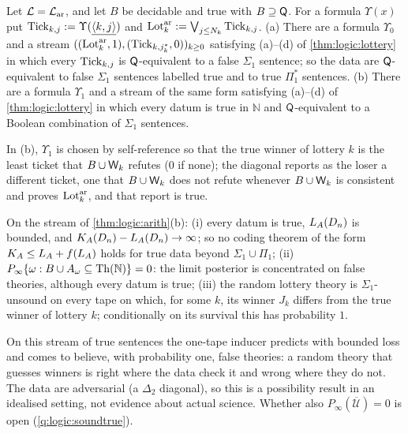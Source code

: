 \begin{theorem}\label{thm:logic:arith}
Let $\mathcal L=\mathcal{L}_{\mathrm{ar}}$, and let $B$ be decidable and true with $B\supseteq\mathsf{Q}$. For a formula $\Upsilon(x)$ put $\mathrm{Tick}_{k,j}:=\Upsilon(\underline{\langle k,j\rangle})$ and $\mathrm{Lot}^{\rm ar}_k:=\bigvee_{j\le N_k}\mathrm{Tick}_{k,j}$.
(a) There are a formula $\Upsilon_0$ and a stream $((\mathrm{Lot}^{\rm ar}_k,1),(\mathrm{Tick}_{k,j^*_k},0))_{k\ge0}$ satisfying (a)--(d) of \cref{thm:logic:lottery} in which every $\mathrm{Tick}_{k,j}$ is $\mathsf{Q}$-equivalent to a false $\Sigma_1$ sentence; so the data are $\mathsf{Q}$-equivalent to false $\Sigma_1$ sentences labelled true and to true $\Pi_1^*$ sentences.
(b) There are a formula $\Upsilon_1$ and a stream of the same form satisfying (a)--(d) of \cref{thm:logic:lottery} in which every datum is true in $\mathbb N$ and $\mathsf{Q}$-equivalent to a Boolean combination of $\Sigma_1$ sentences.
\end{theorem}

In (b), $\Upsilon_1$ is chosen by self-reference so that the true winner of lottery $k$ is the least ticket that $B\cup\mathsf{W}_{k}$ refutes ($0$ if none); the diagonal reports as the loser a different ticket, one that $B\cup\mathsf{W}_{k}$ does not refute whenever $B\cup\mathsf{W}_{k}$ is consistent and proves $\mathrm{Lot}^{\rm ar}_k$, and that report is true.

\begin{corollary}\label{cor:logic:false}
On the stream of \cref{thm:logic:arith}(b):
(i) every datum is true, $L_{A}(D_n)$ is bounded, and $K_{A}(D_n)-L_{A}(D_n)\to\infty$; so no coding theorem of the form $K_{A}\le L_{A}+f(L_{A})$ holds for true data beyond $\Sigma_1\cup\Pi_1$;
(ii) $P_\infty\{\omega:B\cup A_\omega\subseteq\mathrm{Th}(\mathbb N)\}=0$: the limit posterior is concentrated on false theories, although every datum is true;
(iii) the random lottery theory is $\Sigma_1$-unsound on every tape on which, for some $k$, its winner $J_k$ differs from the true winner of lottery $k$; conditionally on its survival this has probability $1$.
\end{corollary}

On this stream of true sentences the one-tape inducer predicts with bounded loss and comes to believe, with probability one, false theories: a random theory that guesses winners is right where the data check it and wrong where they do not. The data are adversarial (a $\Delta_2$ diagonal), so this is a possibility result in an idealised setting, not evidence about actual science. Whether also $P_\infty(\overline{\mathcal U})=0$ is open (\cref{q:logic:soundtrue}).

